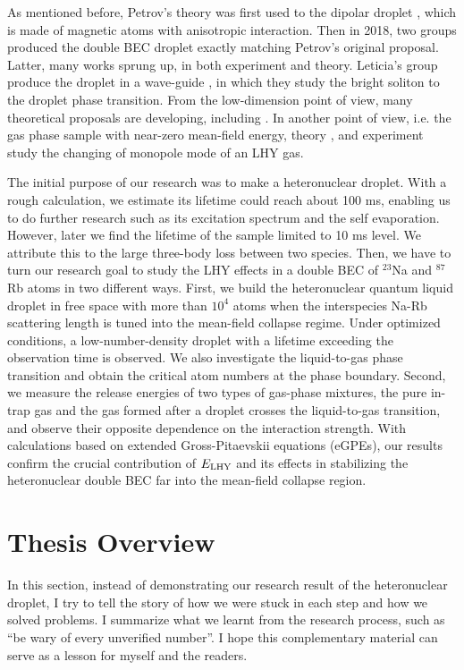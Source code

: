 As mentioned before, Petrov's theory was first used to the dipolar droplet \cite{ferrier2016Liquid,chomaz2016}, which is made of magnetic atoms with anisotropic interaction. Then in 2018, two groups \cite{cabrera2018quantum,semeghini2018self} produced the double BEC droplet exactly matching Petrov's original proposal. Latter, many works sprung up, in both experiment and theory. Leticia's group produce the droplet in a wave-guide \cite{cheiney2018bright}, in which they study the bright soliton to the droplet phase transition. From the low-dimension point of view, many theoretical proposals are developing, including \cite{petrov2016ultradilute,Ilg2018,Cui2021}. In another point of view, i.e. the gas phase sample with near-zero mean-field energy, theory \cite{Jorgensen2018}, and experiment \cite{skov2020} study the changing of monopole mode of an LHY gas. 

The initial purpose of our research was to make a heteronuclear droplet. With a rough calculation, we estimate its lifetime could reach about 100 ms, enabling us to do further research such as its excitation spectrum and the self evaporation. However, later we find the lifetime of the sample limited to 10 ms level. We attribute this to the large three-body loss between two species. Then, we have to turn our research goal to study the LHY effects in a double BEC of $^{23}$Na and $^{87}$Rb atoms in two different ways. First, we build the heteronuclear quantum liquid droplet in free space with more than $10^4$ atoms when the interspecies Na-Rb scattering length is tuned into the mean-field collapse regime. Under optimized conditions, a low-number-density droplet with a lifetime exceeding the observation time is observed. We also investigate the liquid-to-gas phase transition and obtain the critical atom numbers at the phase boundary. Second, we measure the release energies of two types of gas-phase mixtures, the pure in-trap gas and the gas formed after a droplet crosses the liquid-to-gas transition, and observe their opposite dependence on the interaction strength.  With calculations based on extended Gross-Pitaevskii equations (eGPEs), our results confirm the crucial contribution of $E_{\rm LHY}$ and its effects in stabilizing the heteronuclear double BEC far into the mean-field collapse region.

\section{Thesis Overview}
\label{sec:intro-overview}
In this section, instead of demonstrating our research result of the heteronuclear droplet, I try to tell the story of how we were stuck in each step and how we solved problems. I summarize what we learnt from the research process, such as ``be wary of every unverified number''. I hope this complementary material can serve as a lesson for myself and the readers.

